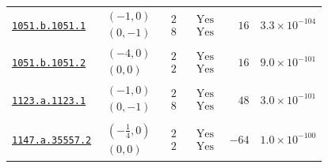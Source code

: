 \begin{table}[htbp]
\begin{tabular}{@{}lcccrr@{}}
\href{https://www.lmfdb.org/Genus2Curve/Q/1051/b/1051/1}{\texttt{1051.b.1051.1}} & $\begin{gathered}(-1,0)\\(0,-1)\end{gathered}$ & $\begin{gathered}2\\8\end{gathered}$ & $\begin{gathered}\mathrm{Yes}\\\mathrm{Yes}\end{gathered}$ & $16$ & $3.3\times 10^{-104}$ \\
\href{https://www.lmfdb.org/Genus2Curve/Q/1051/b/1051/2}{\texttt{1051.b.1051.2}} & $\begin{gathered}(-4,0)\\(0,0)\end{gathered}$ & $\begin{gathered}2\\2\end{gathered}$ & $\begin{gathered}\mathrm{Yes}\\\mathrm{Yes}\end{gathered}$ & $16$ & $9.0\times 10^{-101}$ \\
\href{https://www.lmfdb.org/Genus2Curve/Q/1123/a/1123/1}{\texttt{1123.a.1123.1}} & $\begin{gathered}(-1,0)\\(0,-1)\end{gathered}$ & $\begin{gathered}2\\8\end{gathered}$ & $\begin{gathered}\mathrm{Yes}\\\mathrm{Yes}\end{gathered}$ & $48$ & $3.0\times 10^{-101}$ \\
\href{https://www.lmfdb.org/Genus2Curve/Q/1147/a/35557/2}{\texttt{1147.a.35557.2}} & $\begin{gathered}(-\frac{1}{4},0)\\(0,0)\end{gathered}$ & $\begin{gathered}2\\2\end{gathered}$ & $\begin{gathered}\mathrm{Yes}\\\mathrm{Yes}\end{gathered}$ & $-64$ & $1.0\times 10^{-100}$ \\

\end{tabular}
\end{table}
